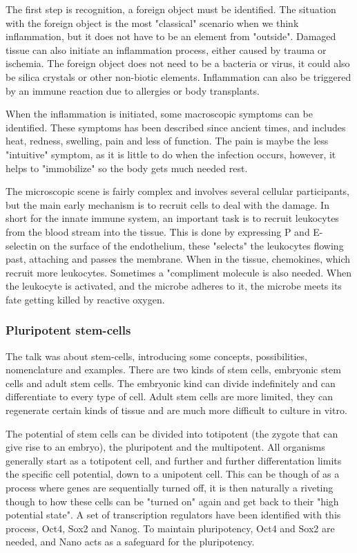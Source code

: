 \documentclass[12p]{article}
\begin{document}
The first step is recognition, a foreign object must be identified.
The situation with the foreign object is the most "classical" scenario when we think inflammation, but it does not have to be an element from "outside".
Damaged tissue can also initiate an inflammation process, either caused by trauma or ischemia.
The foreign object does not need to be a bacteria or virus, it could also be silica crystals or other non-biotic elements.
Inflammation can also be triggered by an immune reaction due to allergies or body transplants.

When the inflammation is initiated, some macroscopic symptoms can be identified.
These symptoms has been described since ancient times, and includes heat, redness, swelling, pain and less of function.
The pain is maybe the less "intuitive" symptom, as it is little to do when the infection occurs, however, it helps to "immobilize" so the body gets much needed rest.

The microscopic scene is fairly complex and involves several cellular participants, but the main early mechanism is to recruit cells to deal with the damage. 
In short for the innate immune system, an important task is to recruit leukocytes from the blood stream into the tissue.
This is done by expressing P and E-selectin on the surface of the endothelium, these "selects" the leukocytes flowing past, attaching and passes the membrane.
When in the tissue, chemokines, which recruit more leukocytes.
Sometimes a "compliment molecule is also needed.
When the leukocyte is activated, and the microbe adheres to it, the microbe meets its fate getting killed by reactive oxygen.

\subsubsection{Pluripotent stem-cells}

The talk was about stem-cells, introducing some concepts, possibilities, nomenclature and examples.
There are two kinds of stem cells, embryonic stem cells and adult stem cells.
The embryonic kind can divide indefinitely and can differentiate to every type of cell.
Adult stem cells are more limited, they can regenerate certain kinds of tissue and are much more difficult to culture in vitro.

The potential of stem cells can be divided into totipotent (the zygote that can give rise to an embryo), the pluripotent and the multipotent.
All organisms generally start as a totipotent cell, and further and further differentation limits the specific cell potential, down to a unipotent cell.
This can be though of as a process where genes are sequentially turned off, it is then naturally a riveting though to how these cells can be "turned on" again and get back to their "high potential state".
A set of transcription regulators have been identified with this process, Oct4, Sox2 and Nanog.
To maintain pluripotency, Oct4 and Sox2 are needed, and Nano acts as a safeguard for the pluripotency.
\end{document}
